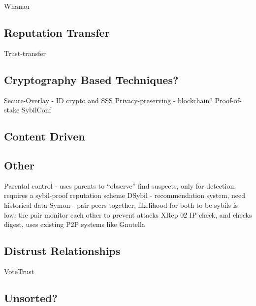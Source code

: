 Whanau\cite{lesniewski2010whanau}


\subsection{Reputation Transfer}
Trust-transfer\cite{seigneur2005trust}

\subsection{Cryptography Based Techniques?}
Secure-Overlay\cite{lua2007securing} - ID crypto and SSS
Privacy-preserving\cite{schaub2016trustless} - blockchain?
Proof-of-stake\cite{dennis2016rep}
SybilConf\cite{tegeler2010sybilconf}

\subsection{Content Driven}
\cite{chatterjee2008robust}

\subsection{Other}
Parental control\cite{tehale2012parental} - uses parents to ``observe'' find suspects, only for detection, requires a sybil-proof reputation scheme
DSybil\cite{yu2009dsybil} - recommendation system, need historical data
Symon\cite{jyothi2009symon} - pair peers together, likelihood for both to be sybils is low, the pair monitor each other to prevent attacks
XRep 02\cite{damiani2002reputation} IP check, and checks digest, uses existing P2P systems like Gnutella

\subsection{Distrust Relationships}
VoteTrust\cite{xue2013votetrust}

\subsection{Unsorted?}

